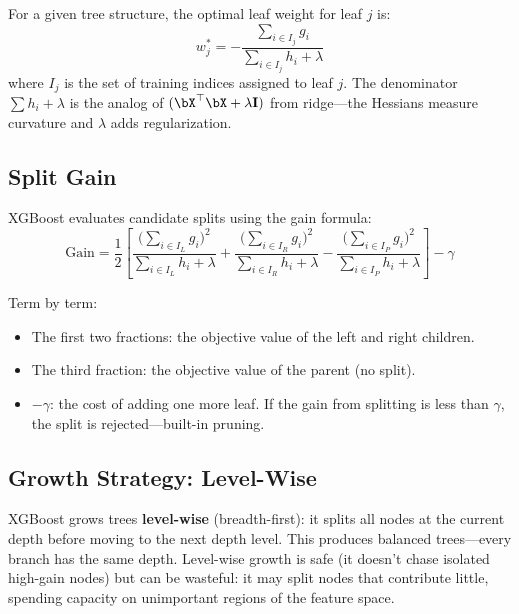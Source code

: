 For a given tree structure, the optimal leaf weight for leaf $j$ is:
\begin{equation}
w_j^* = -\frac{\sum_{i \in I_j} g_i}{\sum_{i \in I_j} h_i + \lambda}
\label{eq:xgb-leaf-weight}
\end{equation}
where $I_j$ is the set of training indices assigned to leaf $j$.
The denominator $\sum h_i + \lambda$ is the analog of $(\bX^\top\bX + \lambda\mathbf{I})$ from ridge---the Hessians measure curvature and $\lambda$ adds regularization.

\subsection{Split Gain}

XGBoost evaluates candidate splits using the gain formula:
\begin{equation}
\mathrm{Gain} = \frac{1}{2}\left[\frac{\big(\sum_{i \in I_L} g_i\big)^2}{\sum_{i \in I_L} h_i + \lambda} + \frac{\big(\sum_{i \in I_R} g_i\big)^2}{\sum_{i \in I_R} h_i + \lambda} - \frac{\big(\sum_{i \in I_P} g_i\big)^2}{\sum_{i \in I_P} h_i + \lambda}\right] - \gamma
\label{eq:xgb-gain}
\end{equation}

Term by term:
\begin{itemize}[nosep]
  \item The first two fractions: the objective value of the left and right children.
  \item The third fraction: the objective value of the parent (no split).
  \item $-\gamma$: the cost of adding one more leaf. If the gain from splitting is less than $\gamma$, the split is rejected---built-in pruning.
\end{itemize}

\subsection{Growth Strategy: Level-Wise}

XGBoost grows trees \textbf{level-wise} (breadth-first): it splits all nodes at the current depth before moving to the next depth level.
This produces balanced trees---every branch has the same depth.
Level-wise growth is safe (it doesn't chase isolated high-gain nodes) but can be wasteful: it may split nodes that contribute little, spending capacity on unimportant regions of the feature space.

